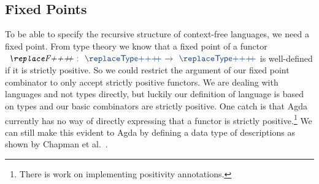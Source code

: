 \begin{code}[hide]
\AgdaSpace{}%
\<%
\\
%
\\[\AgdaEmptyExtraSkip]%
\>[0]\AgdaSpace{}%
\AgdaSpace{}%
\AgdaSpace{}%
\AgdaSpace{}%
\AgdaSymbol{(}\AgdaSpace{}%
\AgdaSpace{}%
\AgdaSpace{}%
\AgdaSymbol{;}\AgdaSpace{}%
\AgdaSpace{}%
\AgdaSpace{}%
\AgdaSpace{}%
\AgdaSymbol{;}\AgdaSpace{}%
\AgdaSpace{}%
\AgdaSpace{}%
\AgdaSpace{}%
\AgdaSymbol{;}\AgdaSpace{}%
\AgdaSpace{}%
\AgdaSpace{}%
\AgdaSpace{}%
\AgdaSymbol{;}\AgdaSpace{}%
\AgdaSpace{}%
\AgdaSpace{}%
\AgdaSpace{}%
\AgdaSymbol{;}\AgdaSpace{}%
\AgdaSpace{}%
\AgdaSpace{}%
\AgdaSymbol{)}\AgdaSpace{}%
\AgdaSpace{}%
\AgdaSymbol{(}\AgdaSpace{}%
\AgdaSymbol{;}\AgdaSpace{}%
\AgdaSymbol{)}\<%
\end{code}

\subsection{Fixed Points}

To be able to specify the recursive structure of context-free languages, we need a fixed point.
From type theory we know that a fixed point of a functor $\ab{F}~\as{:}~\af{Type}~\as{→}~\af{Type}$ is well-defined if it is strictly positive.
So we could restrict the argument of our fixed point combinator to only accept strictly positive functors.
We are dealing with languages and not types directly, but luckily our definition of language is based on types and our basic combinators are strictly positive.
One catch is that Agda currently has no way of directly expressing that a functor is strictly positive.\footnote{There is work on implementing positivity annotations.\cite{positivity}}
We can still make this evident to Agda by defining a data type of descriptions as shown by Chapman et al.~\cite{levitation}.

